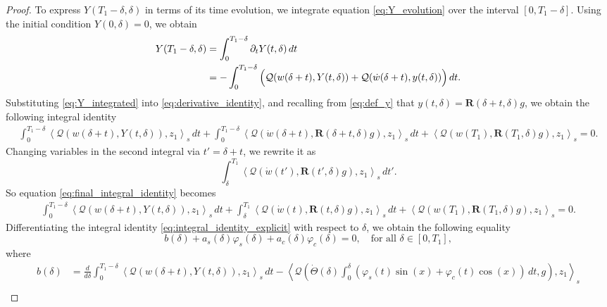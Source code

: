\documentclass[10pt, reqno]{amsart}
\numberwithin{equation}{section}
\begin{document}
\begin{proof}
To express \( Y(T_1 - \delta, \delta) \) in terms of its time evolution, we integrate equation \eqref{eq:Y_evolution} over the interval \( [0, T_1 - \delta] \). Using the initial condition \( Y(0, \delta) = 0 \), we obtain
\begin{align}
	Y(T_1 - \delta, \delta) &= \int_0^{T_1 - \delta} \partial_t Y(t, \delta) \, dt \notag\\
	&= - \int_0^{T_1 - \delta} \Big( \mathcal{Q}(w(\delta + t), Y(t, \delta)) + \mathcal{Q}(\dot{w}(\delta + t), y(t, \delta)) \Big) \, dt. \label{eq:Y_integrated}
\end{align}
Substituting \eqref{eq:Y_integrated} into \eqref{eq:derivative_identity}, and recalling from \eqref{eq:def_y} that \( y(t, \delta) = \mathbf{R}(\delta + t, \delta)g \), we obtain the following integral identity
\begin{align}
	\int_0^{T_1 - \delta} \left\langle \mathcal{Q}(w(\delta + t), Y(t, \delta)), z_1 \right\rangle_s \, dt  + \int_0^{T_1 - \delta} \left\langle \mathcal{Q}(\dot{w}(\delta + t), \mathbf{R}(\delta + t, \delta)g), z_1 \right\rangle_s \, dt + \left\langle \mathcal{Q}(w(T_1), \mathbf{R}(T_1, \delta)g), z_1 \right\rangle_s = 0. \label{eq:final_integral_identity}
\end{align}
Changing variables in the second integral via \( t' = \delta + t \), we rewrite it as
\[
\int_\delta^{T_1} \left\langle \mathcal{Q}(\dot{w}(t'), \mathbf{R}(t', \delta)g), z_1 \right\rangle_s \, dt'.
\]
So equation \eqref{eq:final_integral_identity} becomes
\begin{align}
	\int_0^{T_1 - \delta} \left\langle \mathcal{Q}(w(\delta + t), Y(t, \delta)), z_1 \right\rangle_s \, dt + \int_\delta^{T_1} \left\langle \mathcal{Q}(\dot{w}(t), \mathbf{R}(t, \delta)g), z_1 \right\rangle_s \, dt
	+ \left\langle \mathcal{Q}(w(T_1), \mathbf{R}(T_1, \delta)g), z_1 \right\rangle_s = 0. \label{eq:integral_identity_explicit}
\end{align}
Differentiating the integral identity \eqref{eq:integral_identity_explicit} with respect to \( \delta \), we obtain the following equality
\begin{equation}\label{eq:delta_differentiated_form}
	b(\delta) + a_s(\delta) \varphi_s(\delta) + a_c(\delta) \varphi_c(\delta)  = 0, \quad \text{for all } \delta \in [0, T_1],
\end{equation}
where
\begin{align*}
	b(\delta) &= \frac{d}{d\delta} \int_{0}^{T_1 - \delta} \left\langle \mathcal{Q}(w(\delta + t), Y(t, \delta)), z_1 \right\rangle_s \, dt  - \left\langle \mathcal{Q}( \dot{\varTheta}(\delta)   \int_0^{\delta} \left( \varphi_s(t) \sin(x) + \varphi_c(t) \cos(x) \right) \, dt, g), z_1 \right\rangle_s \\

\end{align*}
\end{proof}
\end{document}
